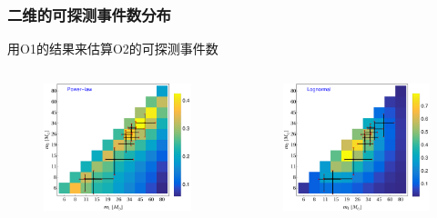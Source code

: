 \documentclass[xcolor={svgnames},compress]{beamer}
\begin{document}
\begin{frame}
    \frametitle{二维的可探测事件数分布}	
    		\vspace{-2mm}
    \centering    
    用O1的结果来估算O2的可探测事件数
    \begin{columns}
        \begin{column}{0.56\textwidth} 
            \begin{figure}[htbp!]
                \centering
                \includegraphics[width = \textwidth]{./pic/events_power01.pdf}
            \end{figure}
            \vspace{-3mm}
            \centering
        \end{column}
        \begin{column}{0.56\textwidth} 
            \begin{figure}[htbp!]
                \centering
                \includegraphics[width = \textwidth]{./pic/events_log01.pdf}

\end{figure}
\end{column}
\end{columns}
\end{frame}
\end{document}
